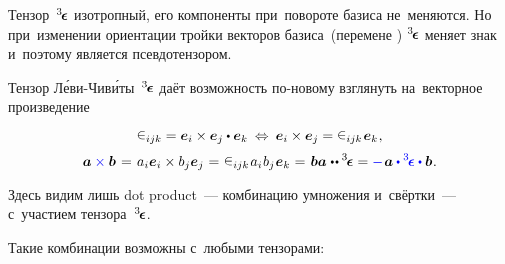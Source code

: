 \begin{otherlanguage}{russian}
Тензор~${^3\hspace{-0.25ex}\bm{\epsilon}}\hspace{.05ex}$ изотропный, его компоненты при~повороте базиса не~меняются.
Но при~изменении ориентации тройки векторов базиса~(перемене )
${^3\hspace{-0.25ex}\bm{\epsilon}}\hspace{.05ex}$ меняет знак и~поэтому является псевдотензором.

Тензор Л\'{е}ви\hbox{-\!}Чив\'{и}ты~${^3\hspace{-0.25ex}\bm{\epsilon}}\hspace{.05ex}$ даёт возможность по\hbox{-}новому взглянуть на~векторное произведение

\nopagebreak\vspace{-0.32em}\begin{equation*}
\levicivita_{ijk} = \bm{e}_i \times \bm{e}_j \dotp \bm{e}_k \:\Leftrightarrow\: \bm{e}_i \times \bm{e}_j
= \levicivita_{ijk} \hspace{.2ex} \bm{e}_k \hspace{.1ex} ,
\end{equation*}\vspace{-1.4em}
\begin{equation}
\bm{a} \mathcolor{blue}{\times} \bm{b} \hspace{.2ex}
= \hspace{.2ex} a_i \bm{e}_i \times b_j \bm{e}_j \hspace{.1ex}
= \hspace{.1ex} \levicivita_{ijk} \hspace{.2ex} a_i \hspace{.1ex} b_j \hspace{.1ex} \bm{e}_k \hspace{.1ex}
= \hspace{.2ex} \bm{b}\bm{a} \hspace{.1ex} \dotdotp \levicivitatensor
= \mathcolor{blue}{-} \hspace{.2ex} \bm{a} \mathcolor{blue}{\dotp \levicivitatensor \dotp} \bm{b}
\hspace{.1ex} .
\end{equation}

\vspace{-0.1em} \noindent Здесь видим лишь dot product~--- комбинацию умножения и~свёртки~--- с~участием тензора~${^3\hspace{-0.25ex}\bm{\epsilon}}\hspace{.05ex}$.

Такие комбинации возможны с~любыми тензорами:


\end{otherlanguage}
